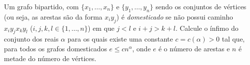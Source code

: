 Um grafo bipartido, com $\{ x_1,\ldots, x_n \}$ e $\{ y_1,\ldots, y_n\}$ sendo os conjuntos de vértices (ou seja, as arestas são da forma $x_iy_j$) é \emph{domesticado} se não possui caminho $x_iy_jx_ky_l$ ($i,j,k,l\in\{ 1,\ldots, n\}$) em que $j<l$ e $i+j>k+l$. Calcule o ínfimo do conjunto dos reais $\alpha$ para os quais existe uma constante $c=c(\alpha)>0$ tal que, para todos os grafos domesticados $e\le cn^{\alpha}$, onde $e$ é o número de arestas e $n$ é metade do número de vértices.
